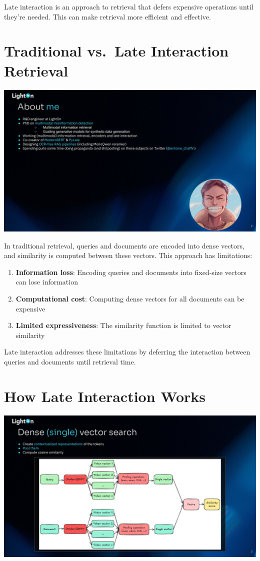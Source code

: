 \documentclass[
  letterpaper,
  oneside]{scrbook}
\providecommand{\tightlist}{%
  \setlength{\itemsep}{0pt}\setlength{\parskip}{0pt}}\usepackage{longtable,booktabs,array}
\begin{document}
Late interaction is an approach to retrieval that defers expensive
operations until they're needed. This can make retrieval more efficient
and effective.

\section{Traditional vs.~Late Interaction
Retrieval}\label{traditional-vs.-late-interaction-retrieval}

\includegraphics{chapters/../p4-images/slide_2.png}

In traditional retrieval, queries and documents are encoded into dense
vectors, and similarity is computed between these vectors. This approach
has limitations:

\begin{enumerate}
\def\labelenumi{\arabic{enumi}.}
\tightlist
\item
  \textbf{Information loss}: Encoding queries and documents into
  fixed-size vectors can lose information
\item
  \textbf{Computational cost}: Computing dense vectors for all documents
  can be expensive
\item
  \textbf{Limited expressiveness}: The similarity function is limited to
  vector similarity
\end{enumerate}

Late interaction addresses these limitations by deferring the
interaction between queries and documents until retrieval time.

\section{How Late Interaction Works}\label{how-late-interaction-works}

\includegraphics{chapters/../p4-images/slide_3.png}
\end{document}

